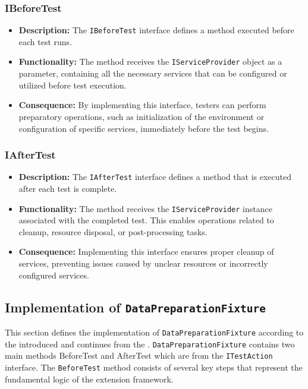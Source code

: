 \subsubsection{IBeforeTest}

\begin{itemize}
    \item \textbf{Description:} The \texttt{IBeforeTest} interface defines a method executed before each test runs.
    \item \textbf{Functionality:} The method receives the \texttt{IServiceProvider} object as a parameter, containing all the necessary services that can be configured or utilized before test execution.
    \item \textbf{Consequence:} By implementing this interface, testers can perform preparatory operations, such as initialization of the environment or configuration of specific services, immediately before the test begins.
\end{itemize}


\subsubsection{IAfterTest}

\begin{itemize}
    \item \textbf{Description:} The \texttt{IAfterTest} interface defines a method that is executed after each test is complete.
    \item \textbf{Functionality:} The method receives the \texttt{IServiceProvider} instance associated with the completed test. This enables operations related to cleanup, resource disposal, or post-processing tasks.
    \item \textbf{Consequence:} Implementing this interface ensures proper cleanup of services, preventing issues caused by unclear resources or incorrectly configured services.
\end{itemize}


\subsection{Implementation of \texttt{DataPreparationFixture}}
This section defines the implementation of \texttt{DataPreparationFixture} according to the introduced  and continues from  the . \texttt{DataPreparationFixture} contains two main methods BeforeTest and AfterTest which are from the \texttt{ITestAction} interface. The \texttt{BeforeTest} method consists of several key steps that represent the fundamental logic of the extension framework.

